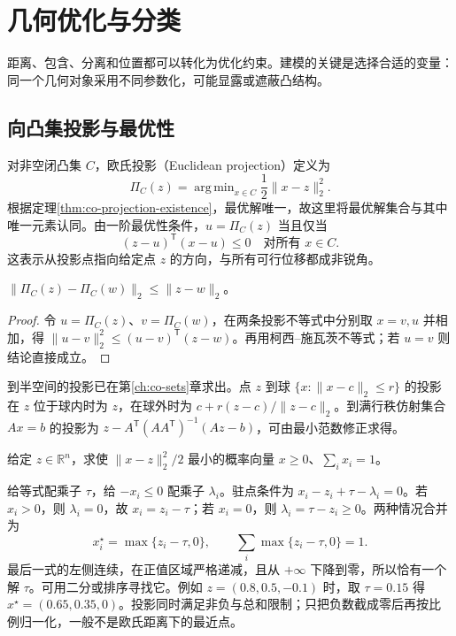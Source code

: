 \documentclass[UTF8,12pt,a4paper,fontset=fandol]{ctexbook}
\begin{document}
\chapter{几何优化与分类}
\label{ch:co-geometry}

距离、包含、分离和位置都可以转化为优化约束。建模的关键是选择合适的变量：同一个几何对象采用不同参数化，可能显露或遮蔽凸结构。

\section{向凸集投影与最优性}

对非空闭凸集 $C$，欧氏投影（Euclidean projection）定义为
\begin{equation}
 \Pi_C(z)=\mathop{\mathrm{arg\,min}}_{x\in C}\frac12\|x-z\|_2^2.
 \label{eq:co-projection}
\end{equation}
根据定理\ref{thm:co-projection-existence}，最优解唯一，故这里将最优解集合与其中唯一元素认同。由一阶最优性条件，$u=\Pi_C(z)$ 当且仅当
\[
 (z-u)^{\mathsf T}(x-u)\leq0\quad\text{对所有 }x\in C.
\]
这表示从投影点指向给定点 $z$ 的方向，与所有可行位移都成非锐角。

\begin{proposition}[投影的非扩张性]
$\|\Pi_C(z)-\Pi_C(w)\|_2\leq\|z-w\|_2$。
\end{proposition}
\begin{proof}
令 $u=\Pi_C(z)$、$v=\Pi_C(w)$，在两条投影不等式中分别取 $x=v,u$ 并相加，得 $\|u-v\|_2^2\leq(u-v)^{\mathsf T}(z-w)$。再用柯西--施瓦茨不等式；若 $u=v$ 则结论直接成立。
\end{proof}

到半空间的投影已在第\ref{ch:co-sets}章求出。点 $z$ 到球 $\{x:\|x-c\|_2\leq r\}$ 的投影在 $z$ 位于球内时为 $z$，在球外时为 $c+r(z-c)/\|z-c\|_2$。到满行秩仿射集合 $Ax=b$ 的投影为 $z-A^{\mathsf T}(AA^{\mathsf T})^{-1}(Az-b)$，可由最小范数修正求得。

\begin{example}[投影到概率单纯形]
给定 $z\in\mathbb R^n$，求使 $\|x-z\|_2^2/2$ 最小的概率向量 $x\geq0$、$\sum_i x_i=1$。
\end{example}
\begin{solve}
给等式配乘子 $\tau$，给 $-x_i\leq0$ 配乘子 $\lambda_i$。驻点条件为 $x_i-z_i+\tau-\lambda_i=0$。若 $x_i>0$，则 $\lambda_i=0$，故 $x_i=z_i-\tau$；若 $x_i=0$，则 $\lambda_i=\tau-z_i\geq0$。两种情况合并为
\begin{equation}
 x_i^\star=\max\{z_i-\tau,0\},\qquad
 \sum_i\max\{z_i-\tau,0\}=1.
 \label{eq:co-simplex-projection}
\end{equation}
最后一式的左侧连续，在正值区域严格递减，且从 $+\infty$ 下降到零，所以恰有一个解 $\tau$。可用二分或排序寻找它。例如 $z=(0.8,0.5,-0.1)$ 时，取 $\tau=0.15$ 得 $x^\star=(0.65,0.35,0)$。投影同时满足非负与总和限制；只把负数截成零后再按比例归一化，一般不是欧氏距离下的最近点。
\end{solve}
\end{document}
